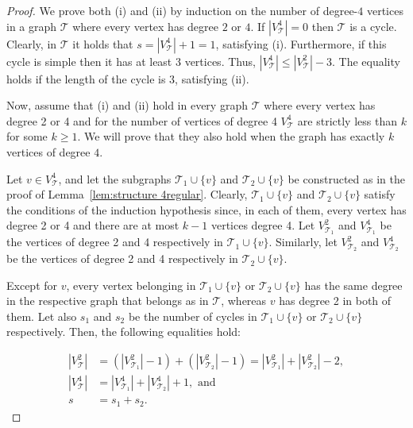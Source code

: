 \documentclass[10pt,a4paper]{amsart}
\begin{document}
        \begin{proof}
            We prove both (i) and (ii) by induction on the number of degree-$4$ vertices in a graph $\mathcal{T}$ where every vertex has degree $2$ or $4$.
            If $|V^4_{\mathcal{T}}|=0$ then $\mathcal{T}$ is a cycle. 
            Clearly, in $\mathcal{T}$ it holds that $s=|V^4_{\mathcal{T}}|+1=1$, satisfying (i).
            Furthermore, if this cycle is simple then it has at least 3 vertices.
            Thus, $|V^4_{\mathcal{T}}|\leq |V^2_{\mathcal{T}}|-3$. 
            The equality holds if the length of the cycle is 3, satisfying (ii).
            
        
            Now, assume that (i) and (ii) hold in  every graph $\mathcal{T}$ where every vertex has degree 2 or 4 and for the number of vertices of degree 4 $V^4_{\mathcal{T}}$  are strictly less than $k$ for some $k \geq 1$. 
            We will prove that they also hold when the graph has exactly $k$ vertices of degree $4$. 
            
            Let $v\in V^4_{\mathcal{T}}$, and let the subgraphs $\mathcal{T}_1\cup\{v\}$ and $\mathcal{T}_2\cup\{v\}$ be constructed as in the proof of Lemma~\ref{lem:structure 4regular}.
            Clearly, $\mathcal{T}_1\cup\{v\}$ and $\mathcal{T}_2\cup\{v\}$ satisfy the conditions of the induction hypothesis since, in each of them, every vertex has degree 2 or 4 and there are at most $k-1$ vertices degree 4.
            Let $V^2_{\mathcal{T}_1}$ and $V^4_{\mathcal{T}_1}$ be the vertices of degree 2 and 4 respectively in $\mathcal{T}_1\cup\{v\}$. 
            Similarly, let $V^2_{\mathcal{T}_2}$ and $V^4_{\mathcal{T}_2}$ be the vertices of degree 2 and 4 respectively in $\mathcal{T}_2\cup\{v\}$.
            
            Except for $v$, every vertex belonging in $\mathcal{T}_1\cup\{v\}$ or $\mathcal{T}_2\cup\{v\}$ has the same degree in the respective graph that belongs as in $\mathcal{T}$, whereas $v$ has degree 2 in both of them. 
            Let also  $s_1$ and $s_2$ be the number of cycles in $\mathcal{T}_1\cup\{v\}$ or $\mathcal{T}_2\cup\{v\}$ respectively. 
            Then, the following equalities hold:
        
        
            \begin{align*}
                |V^2_{\mathcal{T}}| &= (|V^2_{\mathcal{T}_1}|-1)+(|V^2_{\mathcal{T}_2}|-1) = |V^2_{\mathcal{T}_1}|+|V^2_{\mathcal{T}_2}|-2,  \\
                |V^4_{\mathcal{T}}| &= |V^4_{\mathcal{T}_1}|+|V^4_{\mathcal{T}_2}|+1, \text{ and } \\
                s &= s_1+s_2.
            \end{align*}
        

\end{proof}
\end{document}
